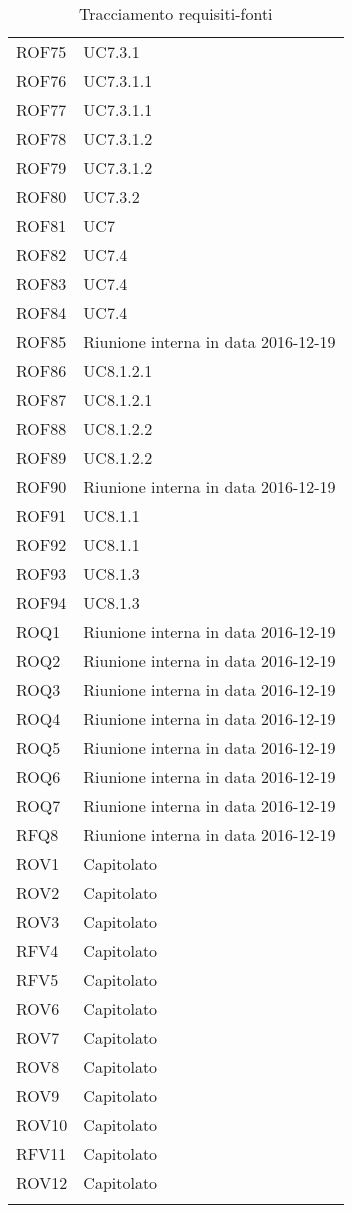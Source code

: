 \documentclass[../AnalisiDeiRequisiti_v3.0.0.tex]{subfiles}
\begin{document}
\begin{longtable}{p{4cm}!{\VRule[1pt]}p{4cm}}
ROF75 & UC7.3.1 \\
ROF76 & UC7.3.1.1 \\
ROF77 & UC7.3.1.1 \\
ROF78 & UC7.3.1.2 \\
ROF79 & UC7.3.1.2 \\
ROF80 & UC7.3.2 \\
ROF81 & UC7 \\
ROF82 & UC7.4 \\
ROF83 & UC7.4 \\
ROF84 & UC7.4 \\
ROF85 & Riunione interna in data 2016-12-19 \\
ROF86 & UC8.1.2.1 \\
ROF87 & UC8.1.2.1 \\
ROF88 & UC8.1.2.2 \\
ROF89 & UC8.1.2.2 \\
ROF90 & Riunione interna in data 2016-12-19 \\
ROF91 & UC8.1.1 \\
ROF92 & UC8.1.1 \\
ROF93 & UC8.1.3 \\
ROF94 & UC8.1.3 \\
ROQ1 & Riunione interna in data 2016-12-19 \\
ROQ2 & Riunione interna in data 2016-12-19 \\
ROQ3 & Riunione interna in data 2016-12-19 \\
ROQ4 & Riunione interna in data 2016-12-19 \\
ROQ5 & Riunione interna in data 2016-12-19 \\
ROQ6 & Riunione interna in data 2016-12-19 \\
ROQ7 & Riunione interna in data 2016-12-19 \\
RFQ8 & Riunione interna in data 2016-12-19 \\
ROV1 & Capitolato \\
ROV2 & Capitolato \\
ROV3 & Capitolato \\
RFV4 & Capitolato \\
RFV5 & Capitolato \\
ROV6 & Capitolato \\
ROV7 & Capitolato \\
ROV8 & Capitolato \\
ROV9 & Capitolato \\
ROV10 & Capitolato \\
RFV11 & Capitolato \\
ROV12 & Capitolato \\
\caption{Tracciamento requisiti-fonti}
\end{longtable}
\end{document}
